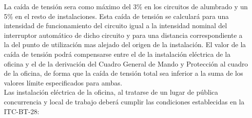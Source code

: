 La caída de tensión sera como máximo del 3\% en los circuitos de alumbrado y un 5\% en el resto de instalaciones. Esta caída de tensión se calculará para una intensidad de funcionamiento del circuito igual a la intensidad nominal del interruptor automático de dicho circuito y para una distancia correspondiente a la del punto de utilización mas alejado del origen de la instalación. El valor de la caída de tensión podrá compensarse entre el de la instalación eléctrica de la oficina y el de la derivación del Cuadro General de Mando y Protección al cuadro de la oficina, de forma que la caída de tensión total sea inferior a la suma de los valores límite especificados para ambas.\\


Las instalación eléctrica de la oficina, al tratarse de un lugar de pública concurrencia y local de trabajo deberá cumplir las condiciones establecidas en la ITC-BT-28: \\

